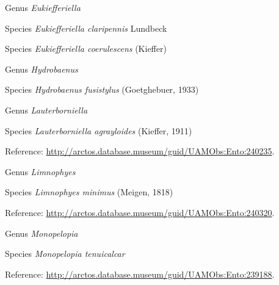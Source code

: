 \documentclass[9pt, article]{memoir}
\begin{document}
\begin{multicols}{2}
\vspace{6pt}\noindent\hspace{30pt}Genus \textit{Eukiefferiella}


\vspace{6pt}\noindent\hspace{36pt}Species \textit{Eukiefferiella claripennis} Lundbeck


\vspace{6pt}\noindent\hspace{36pt}Species \textit{Eukiefferiella coerulescens} (Kieffer)


\vspace{6pt}\noindent\hspace{30pt}Genus \textit{Hydrobaenus}


\vspace{6pt}\noindent\hspace{36pt}Species \textit{Hydrobaenus fusistylus} (Goetghebuer, 1933)


\vspace{6pt}\noindent\hspace{30pt}Genus \textit{Lauterborniella}


\vspace{6pt}\noindent\hspace{36pt}Species \textit{Lauterborniella agrayloides} (Kieffer, 1911)


\vspace{6pt}Reference: 
\url{http://arctos.database.museum/guid/UAMObs:Ento:240235}.

\vspace{6pt}\noindent\hspace{30pt}Genus \textit{Limnophyes}


\vspace{6pt}\noindent\hspace{36pt}Species \textit{Limnophyes minimus} (Meigen, 1818)


\vspace{6pt}Reference: 
\url{http://arctos.database.museum/guid/UAMObs:Ento:240320}.

\vspace{6pt}\noindent\hspace{30pt}Genus \textit{Monopelopia}


\vspace{6pt}\noindent\hspace{36pt}Species \textit{Monopelopia tenuicalcar}


\vspace{6pt}Reference: 
\url{http://arctos.database.museum/guid/UAMObs:Ento:239188}.


\end{multicols}
\end{document}
